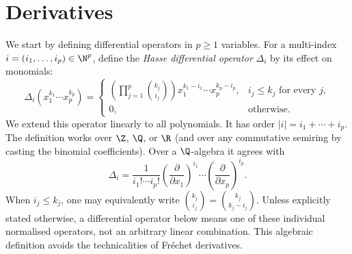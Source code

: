 \section{Derivatives}

We start by defining differential operators in $p\geq1$ variables.
For a multi-index $i=(i_1,\dots,i_p)\in\N^p$, define the \emph{Hasse differential operator}
$\Delta_i$ by its effect on monomials:
\[
\Delta_i(x_1^{k_1}\cdots x_p^{k_p})=
\begin{cases}
\displaystyle\left(\prod_{j=1}^p {k_j\choose i_j}\right)
 x_1^{k_1-i_1}\cdots x_p^{k_p-i_p},& i_j\leq k_j\text{ for every }j,\\[3pt]
0,&\text{otherwise}.
\end{cases}
\]
We extend this operator linearly to all polynomials. It has order
$|i|=i_1+\cdots+i_p$. The definition works over $\Z$, $\Q$, or $\R$
(and over any commutative semiring by casting the binomial coefficients).
Over a $\Q$-algebra it agrees with
\[
\Delta_i=\frac{1}{i_1!\cdots i_p!}
 \left(\frac{\partial}{\partial x_1}\right)^{i_1}\cdots
 \left(\frac{\partial}{\partial x_p}\right)^{i_p}.
\]
When $i_j\leq k_j$, one may equivalently write
${k_j\choose i_j}={k_j\choose k_j-i_j}$.
Unless explicitly stated otherwise, a differential operator below means one
of these individual normalised operators, not an arbitrary linear combination.
This algebraic definition avoids the technicalities of Fr\'echet derivatives.



